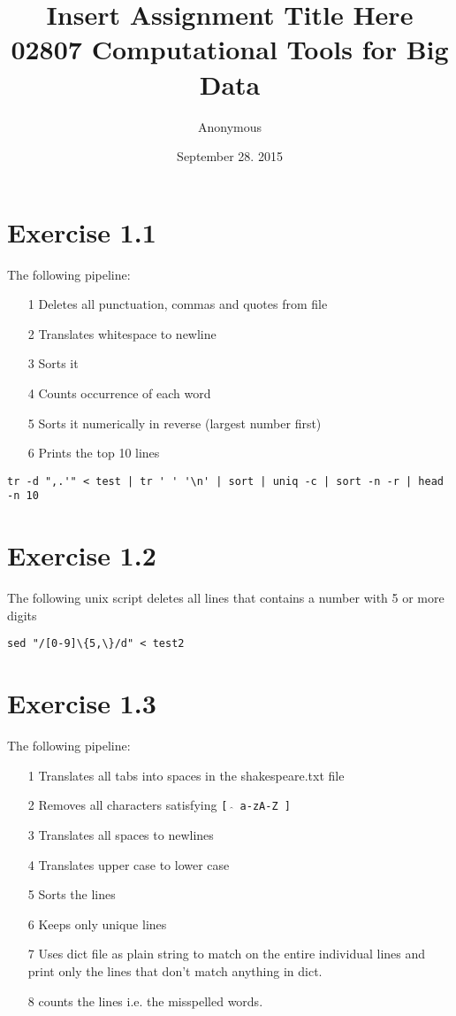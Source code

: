 \documentclass{article}
\title{Insert Assignment Title Here\\02807 Computational Tools for Big Data}
\author{Anonymous}
\date{September 28. 2015}
\begin{document}
\maketitle

\section{Exercise 1.1}

The following pipeline:
\begin{itemize}
\item[1] Deletes all punctuation, commas and quotes from file
\item[2] Translates whitespace to newline
\item[3] Sorts it
\item[4] Counts occurrence of each word
\item[5] Sorts it numerically in reverse (largest number first)
\item[6] Prints the top 10 lines
\end{itemize}

\begin{verbatim}
tr -d ",.'" < test | tr ' ' '\n' | sort | uniq -c | sort -n -r | head -n 10
\end{verbatim}

\section{Exercise 1.2}

The following unix script deletes all lines that contains a number with 5 or more digits

\begin{verbatim}
sed "/[0-9]\{5,\}/d" < test2
\end{verbatim}


\section{Exercise 1.3}

The following pipeline:
\begin{itemize}
\item[1] Translates all tabs into spaces in the shakespeare.txt file
\item[2] Removes all characters satisfying \texttt{[\ $\hat{}$\ a-zA-Z ]}
\item[3] Translates all spaces to newlines
\item[4] Translates upper case to lower case
\item[5] Sorts the lines
\item[6] Keeps only unique lines
\item[7] Uses dict file as plain string to match on the entire individual lines and print only the lines that don't match anything in dict.
\item[8] counts the lines i.e. the misspelled words.
\end{itemize}
\end{document}
